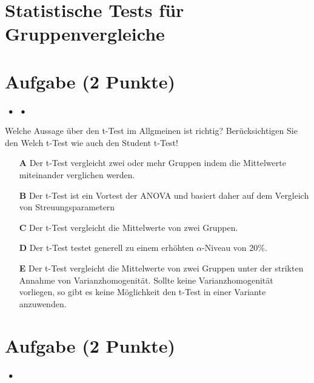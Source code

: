 \documentclass[a4paper, 9pt]{scrartcl}\usepackage[]{graphicx}\usepackage[]{xcolor}
\begin{document}
\section*{Statistische Tests für Gruppenvergleiche} 

\section{Aufgabe \hfill (2 Punkte)}

\ifcollection
\begin{flushright}
\tiny\vspace{-2Ex}
\textbf{\examinhaltstart}
\exammodulemathstat $\;\bullet$
\exammodulestat $\;\bullet$
\exammodulestatbbv 
\vspace{-1Ex}
\end{flushright}
\fi




Welche Aussage über den t-Test im Allgmeinen ist richtig? Berücksichtigen Sie den Welch t-Test wie auch den Student t-Test!



\begin{enumerate}
\item [\textbf{A} \msquare] Der t-Test vergleicht zwei oder mehr Gruppen indem die Mittelwerte miteinander verglichen werden.
\item [\textbf{B} \msquare] Der t-Test ist ein Vortest der ANOVA und basiert daher auf dem Vergleich von Streuungsparametern
\item [\textbf{C} \msquare] Der t-Test vergleicht die Mittelwerte von zwei Gruppen.
\item [\textbf{D} \msquare] Der t-Test testet generell zu einem erhöhten $\alpha$-Niveau von 20\%.
\item [\textbf{E} \msquare] Der t-Test vergleicht die Mittelwerte von zwei Gruppen unter der strikten Annahme von Varianzhomogenität. Sollte keine Varianzhomogenität vorliegen, so gibt es keine Möglichkeit den t-Test in einer Variante anzuwenden.
\end{enumerate}

\section{Aufgabe \hfill (2 Punkte)}

\ifcollection
\begin{flushright}
\tiny\vspace{-2Ex}
\textbf{\examinhaltstart}
\exammodulestatversuch $\;\bullet$
\exammodulebiostat
\vspace{-1Ex}
\end{flushright}
\fi
\end{document}
